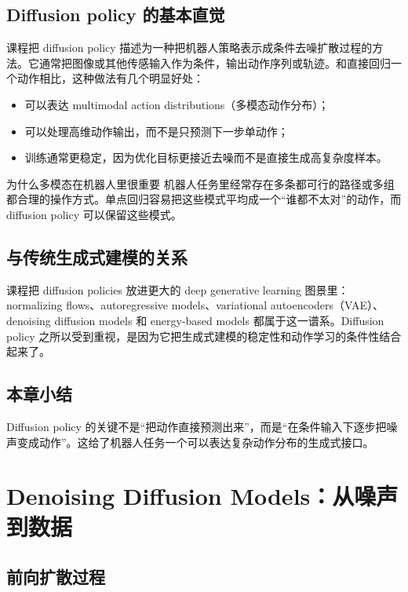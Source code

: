 \documentclass[a4paper]{article}
\begin{document}
\subsection{Diffusion policy 的基本直觉}

课程把 diffusion policy 描述为一种把机器人策略表示成条件去噪扩散过程的方法。它通常把图像或其他传感输入作为条件，输出动作序列或轨迹。和直接回归一个动作相比，这种做法有几个明显好处：
\begin{itemize}
  \item 可以表达 multimodal action distributions（多模态动作分布）；
  \item 可以处理高维动作输出，而不是只预测下一步单动作；
  \item 训练通常更稳定，因为优化目标更接近去噪而不是直接生成高复杂度样本。
\end{itemize}

\begin{knowledgebox}{为什么多模态在机器人里很重要}
机器人任务里经常存在多条都可行的路径或多组都合理的操作方式。单点回归容易把这些模式平均成一个“谁都不太对”的动作，而 diffusion policy 可以保留这些模式。
\end{knowledgebox}

\subsection{与传统生成式建模的关系}

课程把 diffusion policies 放进更大的 deep generative learning 图景里：normalizing flows、autoregressive models、variational autoencoders（VAE）、denoising diffusion models 和 energy-based models 都属于这一谱系。Diffusion policy 之所以受到重视，是因为它把生成式建模的稳定性和动作学习的条件性结合起来了。

\subsection{本章小结}

Diffusion policy 的关键不是“把动作直接预测出来”，而是“在条件输入下逐步把噪声变成动作”。这给了机器人任务一个可以表达复杂动作分布的生成式接口。

\section{Denoising Diffusion Models：从噪声到数据}

\subsection{前向扩散过程}
\end{document}
